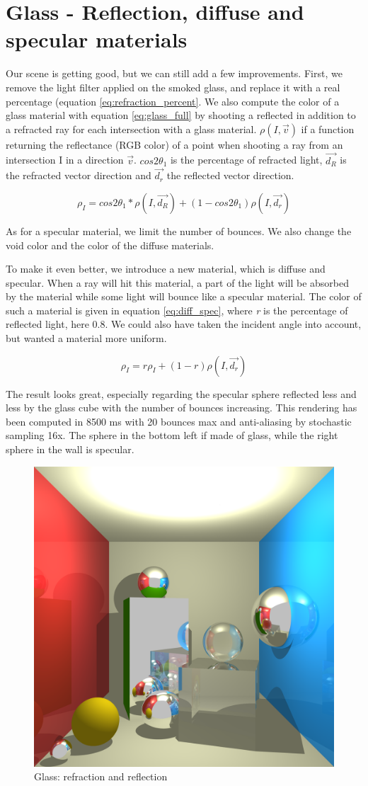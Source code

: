 \section{Glass - Reflection, diffuse and specular materials}
Our scene is getting good, but we can still add a few improvements. First, we remove the light filter applied on the smoked glass, and replace it with a real percentage (equation \ref{eq:refraction_percent}. We also compute the color of a glass material with equation \ref{eq:glass_full} by shooting a reflected in addition to a refracted ray for each intersection with a glass material. $\rho(I, \vec{v})$ if a function returning the reflectance (RGB color) of a point when shooting a ray from an intersection I in a direction $\vec{v}$. $cos2\theta_1$ is the percentage of refracted light, $\vec{d_R}$ is the refracted vector direction and $\vec{d_r}$ the reflected vector direction.

\begin{equation}
\rho_I = cos2\theta_1 * \rho(I, \vec{d_R}) + (1 - cos2\theta_1) \rho(I, \vec{d_r})
\label{eq:glass_full}
\end{equation}

As for a specular material, we limit the number of bounces. We also change the void color and the color of the diffuse materials.

To make it even better, we introduce a new material, which is diffuse and specular. When a ray will hit this material, a part of the light will be absorbed by the material while some light will bounce like a specular material. The color of such a material is given in equation \ref{eq:diff_spec}, where \textit{r} is the percentage of reflected light, here 0.8. We could also have taken the incident angle into account, but wanted a material more uniform.

\begin{equation}
\rho_I = r \rho_I + (1 - r) \rho(I, \vec{d_r})
\label{eq:diff_spec}
\end{equation}

The result looks great, especially regarding the specular sphere reflected less and less by the glass cube with the number of bounces increasing. This rendering has been computed in 8500 ms with 20 bounces max and anti-aliasing by stochastic sampling 16x. The sphere in the bottom left if made of glass, while the right sphere in the wall is specular.

\begin{figure}[H]
\centering
\includegraphics[width=0.35\linewidth]{img/glass_awesome.png}
\caption{Glass: refraction and reflection}
\end{figure}


